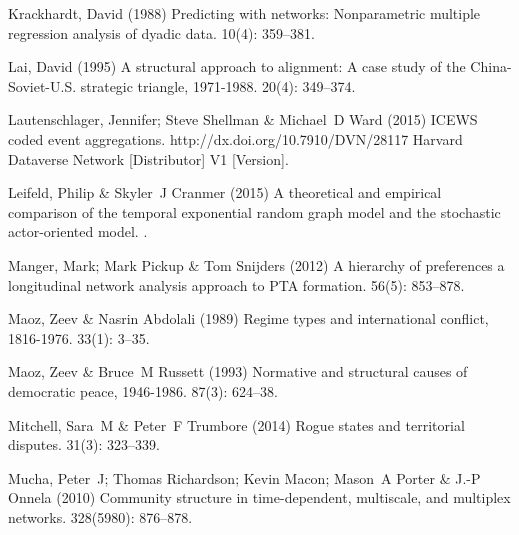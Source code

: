 \documentclass[3p,times,twocolumn,authoryear,12pt]{elsarticle}
\begin{document}
\begin{thebibliography}{}
Krackhardt, David (1988) Predicting with networks: Nonparametric multiple
  regression analysis of dyadic data.
 { 10\/}(4): 359--381.

Lai, David (1995) A structural approach to alignment: A case study of the
  {China-Soviet-U.S.} strategic triangle, 1971-1988.
 { 20\/}(4): 349--374.

Lautenschlager, Jennifer; Steve Shellman  \& Michael~D Ward (2015) {ICEWS}
  coded event aggregations.
\newblock http://dx.doi.org/10.7910/DVN/28117 Harvard Dataverse Network
  [Distributor] V1 [Version].

Leifeld, Philip  \& Skyler~J Cranmer (2015) A theoretical and empirical
  comparison of the temporal exponential random graph model and the stochastic
  actor-oriented model.
.

Manger, Mark; Mark Pickup  \& Tom Snijders (2012) A hierarchy of preferences a
  longitudinal network analysis approach to {PTA} formation.
 { 56\/}(5): 853--878.

Maoz, Zeev  \& Nasrin Abdolali (1989) Regime types and international conflict,
  1816-1976.
 { 33\/}(1): 3--35.

Maoz, Zeev  \& Bruce~M Russett (1993) Normative and structural causes of
  democratic peace, 1946-1986.
 { 87\/}(3): 624--38.

Mitchell, Sara~M  \& Peter~F Trumbore (2014) Rogue states and territorial
  disputes.
 { 31\/}(3): 323--339.

Mucha, Peter~J; Thomas Richardson; Kevin Macon; Mason~A Porter  \& J.-P Onnela
  (2010) Community structure in time-dependent, multiscale, and multiplex
  networks.
 { 328\/}(5980): 876--878.


\end{thebibliography}
\end{document}
